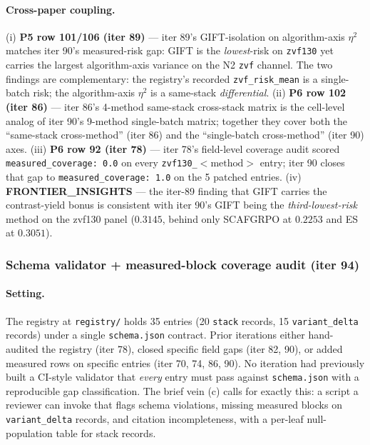 \documentclass{article}
\begin{document}
\paragraph{Cross-paper coupling.}
(i) \textbf{P5 row 101/106 (iter 89)} --- iter 89's GIFT-isolation on
algorithm-axis $\eta^2$ matches iter 90's measured-risk gap: GIFT is the
\emph{lowest}-risk on \texttt{zvf130} yet carries the largest algorithm-axis
variance on the N2 \texttt{zvf} channel. The two findings are
complementary: the registry's recorded \texttt{zvf\_risk\_mean} is a
single-batch risk; the algorithm-axis $\eta^2$ is a same-stack
\emph{differential}. (ii) \textbf{P6 row 102 (iter 86)} --- iter 86's
4-method same-stack cross-stack matrix is the cell-level analog of
iter 90's 9-method single-batch matrix; together they cover both the
``same-stack cross-method'' (iter 86) and the ``single-batch cross-method''
(iter 90) axes. (iii) \textbf{P6 row 92 (iter 78)} --- iter 78's
field-level coverage audit scored \texttt{measured\_coverage: 0.0} on
every \texttt{zvf130\_$<\mathrm{method}>$} entry; iter 90 closes that
gap to \texttt{measured\_coverage: 1.0} on the 5 patched entries. (iv)
\textbf{FRONTIER\_INSIGHTS} --- the iter-89 finding that GIFT carries the
contrast-yield bonus is consistent with iter 90's GIFT being the
\emph{third-lowest-risk} method on the zvf130 panel ($0.3145$, behind only
SCAFGRPO at $0.2253$ and ES at $0.3051$). 

\subsubsection{Schema validator + measured-block coverage audit (iter 94)}
\label{sec:p6-iter94-schema-validator}

\paragraph{Setting.}
The registry at \texttt{registry/} holds 35 entries (20 \texttt{stack} records,
15 \texttt{variant\_delta} records) under a single \texttt{schema.json} contract.
Prior iterations either hand-audited the registry (iter 78), closed specific
field gaps (iter 82, 90), or added measured rows on specific entries (iter 70,
74, 86, 90). No iteration had previously built a CI-style validator that
\emph{every} entry must pass against \texttt{schema.json} with a reproducible
gap classification. The brief vein (c) calls for exactly this: a script a
reviewer can invoke that flags schema violations, missing measured blocks on
\texttt{variant\_delta} records, and citation incompleteness, with a per-leaf
null-population table for stack records.
\end{document}

